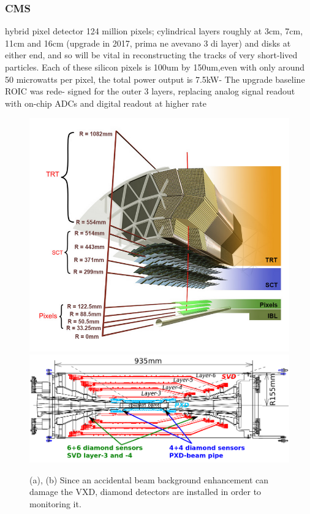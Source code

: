         \subsubsection{CMS}
         hybrid pixel detector
        124 million pixels; cylindrical layers roughly at 3cm, 7cm, 11cm and 16cm (upgrade in 2017, prima ne avevano 3 di layer) and disks at either end, and so will be vital in reconstructing the tracks of very short-lived particles. Each of these silicon pixels is 100um by 150um,even with  only around 50 microwatts per pixel, the total power output is 7.5kW-
        The upgrade baseline ROIC was rede-
signed for the outer 3 layers, replacing analog signal readout
with on-chip ADCs and digital readout at higher rate
        \begin{figure}[h!]
            \centering
            \includegraphics[width=.49\linewidth]{figures/pixel_detectors_usage/ATLAS.png}
            \includegraphics[width=.49\linewidth]{figures/pixel_detectors_usage/SVD_Belle2.png}
            \caption{(a), (b) Since an accidental beam background enhancement can damage the VXD, diamond detectors are installed in order to monitoring it.}
            \label{fig:}
        \end{figure}

